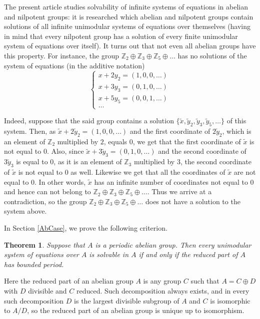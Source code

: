 \documentclass{article}
\newtheorem{theorem}{Theorem}
\theoremstyle{definition}
\theoremstyle{remark}
\let\tilde\widetilde
\begin{document}
The present article studies solvability of
infinite systems of equations in abelian and nilpotent groups:
it is researched which abelian and nilpotent groups
contain solutions of all infinite unimodular
systems of equations over themselves
(having in mind that every nilpotent group
has a solution of every finite unimodular
system of equations over itself).
It turns out that not even all abelian groups
have this property. For instance, the group
$\mathbb Z_2 \oplus \mathbb Z_3 \oplus \mathbb Z_5 \oplus \ldots$
has no solutions of the system of equations (in the additive notation)
$$
\begin{cases}
x+ 2y_2= (1,0,0,\ldots)\\
x + 3y_3 = (0,1,0,\ldots)\\
x + 5y_5 = (0,0,1,\ldots)\\
\ldots
\end{cases}
$$

Indeed, suppose that the said group contains
a solution $\{\tilde x, \tilde y_2, \tilde y_3, \tilde y_5, \ldots\}$ of this system.
Then, as $\tilde x+ 2\tilde y_2= (1,0,0,\ldots)$
and the first coordinate of $2\tilde y_2$,
which is an element of $\mathbb Z_2$
multiplied by $2$,
equals $0$, we get that the first coordinate
of $\tilde x$ is not equal to $0$.
Also, since $\tilde x + 3\tilde y_3 = (0,1,0,\ldots)$
and the second coordinate of $3\tilde y_3$
is equal to $0$, as it is an element of $\mathbb Z_3$
multiplied by $3$, the second coordinate
of $\tilde x$ is not equal to $0$ as well.
Likewise we get that all the coordinates of $\tilde x$
are not equal to $0$. In other words, 
$\tilde x$ has an infinite number of coordinates not equal to $0$
and hence can not belong to $\mathbb Z_2 \oplus \mathbb Z_3 \oplus \mathbb Z_5 \oplus \ldots$.
Thus we arrive at a contradiction, so the group
$\mathbb Z_2 \oplus \mathbb Z_3 \oplus \mathbb Z_5 \oplus \ldots$
does not have a solution to the system above.

In Section \ref{AbCase}, we prove the following criterion.
\begin{theorem} \label{Criteria}
Suppose that $A$ is a periodic abelian group.
Then every unimodular system of equations over $A$ is solvable
in $A$ if and only if the reduced part of $A$ has bounded period.
\end{theorem}

Here the reduced part of an abelian group $A$
is any group $C$ such that $A = C \oplus D$
with $D$ divisible and $C$ reduced.
Such decomposition always exists, and in every
such decomposition $D$ is the largest divisible subgroup
of $A$ and $C$ is isomorphic to $A/D$,
so the reduced part of an abelian group
is unique up to isomorphism.
\end{document}
